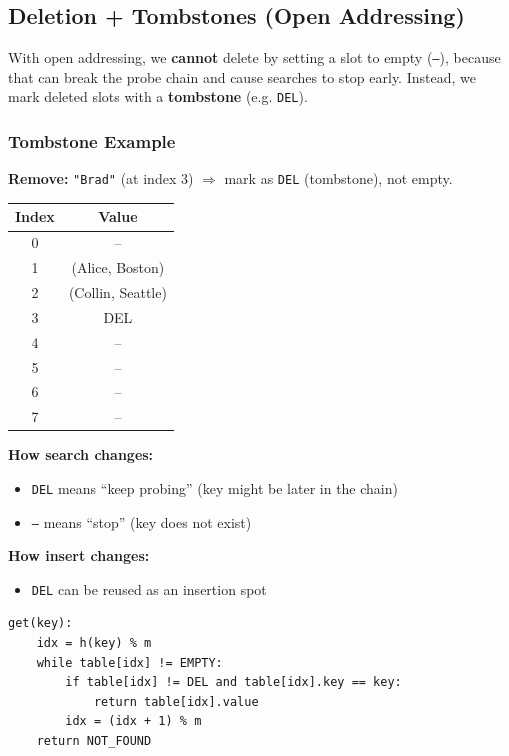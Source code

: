 \documentclass{article}
\begin{document}
\subsection{Deletion + Tombstones (Open Addressing)}
With open addressing, we \textbf{cannot} delete by setting a slot to empty (\texttt{--}), because that can break the probe chain and cause searches to stop early.  
Instead, we mark deleted slots with a \textbf{tombstone} (e.g. \texttt{DEL}).

\subsubsection*{Tombstone Example}
\textbf{Remove:} \texttt{"Brad"} (at index 3) $\Rightarrow$ mark as \texttt{DEL} (tombstone), not empty.

\begin{center}
\begin{tabular}{c c}
\toprule
Index & Value \\
\midrule
0 & -- \\
1 & (Alice, Boston) \\
2 & (Collin, Seattle) \\
3 & DEL \\
4 & -- \\
5 & -- \\
6 & -- \\
7 & -- \\
\bottomrule
\end{tabular}
\end{center}

\textbf{How search changes:}
\begin{itemize}
  \item \texttt{DEL} means ``keep probing'' (key might be later in the chain)
  \item \texttt{--} means ``stop'' (key does not exist)
\end{itemize}

\textbf{How insert changes:}
\begin{itemize}
  \item \texttt{DEL} can be reused as an insertion spot
\end{itemize}

\begin{verbatim}
get(key):
    idx = h(key) % m
    while table[idx] != EMPTY:
        if table[idx] != DEL and table[idx].key == key:
            return table[idx].value
        idx = (idx + 1) % m
    return NOT_FOUND
\end{verbatim}
\end{document}
